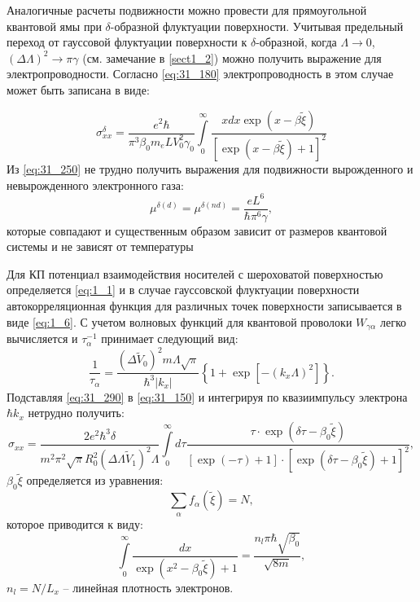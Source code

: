 Аналогичные расчеты подвижности можно провести для прямоугольной квантовой ямы при $\delta$-образной флуктуации поверхности. Учитывая предельный переход от гауссовой флуктуации поверхности к $\delta $-образной, когда $\Lambda \to 0$, ${\left(\Delta \Lambda \right)}^2\to \pi \gamma $ (см. замечание в \ref{sect1_2}) можно получить выражение для электропроводности. Согласно \eqref{eq:31_180} электропроводность в этом случае может быть записана в виде:

\begin{equation} \label{eq:31_250}
{\sigma }^{\delta }_{xx}=\frac{e^2\hbar }{{\pi }^3{\beta }_0 m_e L V^2_0 \gamma_0 }\int\limits_0^\infty{\frac{x dx \exp{(x-\beta \widetilde{\xi })}}{{\left[ \exp{(x-\beta \widetilde{\xi })}+1 \right] }^2}}
\end{equation}
Из \eqref{eq:31_250} не трудно получить выражения для подвижности вырожденного и невырожденного электронного газа: 
\begin{equation} \label{eq:31_260}
\mu^{\delta \left(d\right)} = \mu^{\delta \left(n d\right)}=\frac{e L^6}{\hbar {\pi }^6\gamma },
\end{equation}
которые совпадают и существенным образом зависит от размеров квантовой системы и не зависят от температуры

Для КП потенциал взаимодействия носителей с шероховатой поверхностью определяется \eqref{eq:1_1} и в случае гауссовской флуктуации поверхности автокорреляционная функция для различных точек поверхности записывается в виде \eqref{eq:1_6}. С учетом волновых функций для квантовой проволоки \cite{Constantinou1989} $W_{\gamma \alpha } $ легко вычисляется и $\tau_{\alpha }^{-1} $ принимает следующий вид:
\begin{equation} \label{eq:31_290}
\frac{1}{\tau _{\alpha } } =\frac{(\Delta \tilde{V}_0 )^2 m\Lambda \sqrt{\pi } }{\hbar^3 \left|k_x \right|} \left\{1+ \exp\left[-\left(k_x \Lambda \right)^2 \right]\right\}.
\end{equation}
Подставляя \eqref{eq:31_290} в \eqref{eq:31_150} и интегрируя по квазиимпульсу электрона $\hbar k_x $ нетрудно получить:
\begin{equation} \label{eq:31_300}
\sigma_{xx} =\frac{2 e^2 \hbar^3 \delta }{m^2 \pi^2 \sqrt{\pi } R_0^2 (\Delta \Lambda \tilde{V}_1 )^2 \Lambda } \int \limits_0^{\infty }{d\tau \frac{\tau \cdot \exp(\delta \tau -\beta_0 \tilde{\xi })}{\left[ \exp(-\tau )+1\right] \cdot \left[ \exp(\delta \tau -\beta_0 \tilde{\xi })+1\right]^2 }},
\end{equation}
$\beta_0 \tilde{\xi }$ определяется из уравнения:
\[
\sum_{\alpha } {f_{\alpha}(\tilde{\xi }) = N},
\]
которое приводится к виду:
\begin{equation} \label{eq:31_305}
\int\limits_0^{\infty }{\frac{dx}{\exp \left(x^2 -\beta_0 \tilde{\xi }\right)+1}} =\frac{n_l \pi \hbar \sqrt{\beta_0 } }{\sqrt{8m} },
\end{equation}
$n_{l} =N/L_{x} $ -- линейная плотность электронов.

